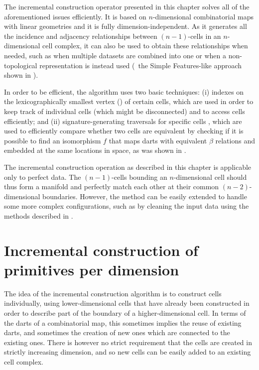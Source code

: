 The incremental construction operator presented in this chapter solves all of the aforementioned issues efficiently.
It is based on $n$-dimensional combinatorial maps with linear geometries and it is fully dimension-independent.
As it generates all the incidence and adjacency relationships between $(n-1)$-cells in an $n$-dimensional cell complex, it can also be used to obtain these relationships when needed, such as when multiple datasets are combined into one or when a non-topological representation is instead used (\eg\ the Simple Features-like approach shown in ).

In order to be efficient, the algorithm uses two basic techniques: (i) indexes on the lexicographically smallest vertex () of certain cells, which are used in order to keep track of individual cells (which might be disconnected) and to access cells efficiently; and (ii) signature-generating traversals for specific cells \citep{Gosselin11}, which are used to efficiently compare whether two cells are equivalent by checking if it is possible to find an isomorphism $f$ that maps darts with equivalent $\beta$ relations and embedded at the same locations in space, as was shown in .

The incremental construction operation as described in this chapter is applicable only to perfect data.
The $(n-1)$-cells bounding an $n$-dimensional cell should thus form a manifold and perfectly match each other at their common $(n-2)$-dimensional boundaries.
However, the method can be easily extended to handle some more complex configurations, such as by cleaning the input data using the methods described in .

\section{Incremental construction of primitives per dimension}
\label{se:primitives}

The idea of the incremental construction algorithm is to construct cells individually, using lower-dimensional cells that have already been constructed in order to describe part of the boundary of a higher-dimensional cell.
In terms of the darts of a combinatorial map, this sometimes implies the reuse of existing darts, and sometimes the creation of new ones which are connected to the existing ones.
There is however no strict requirement that the cells are created in strictly increasing dimension, and so new cells can be easily added to an existing cell complex.

